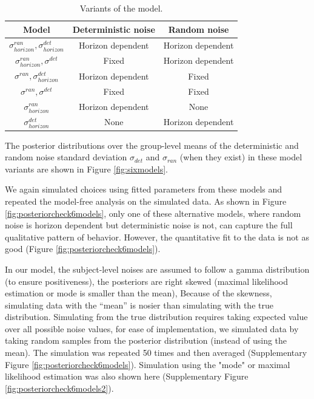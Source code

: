\documentclass[12pt]{article}
\begin{document}
	\begin{table}[h]
		\small
		\centering
		\begin{tabular}{|c|c|c|}
			\hline
			Model & Deterministic noise & Random noise \\
			\hline
			$\sigma^{ran}_{horizon},\sigma^{det}_{horizon}$  & Horizon dependent & Horizon dependent\\
			\hline
			$\sigma^{ran}_{horizon},\sigma^{det}_{}$ & Fixed & Horizon dependent\\
			\hline
			$\sigma^{ran}_{},\sigma^{det}_{horizon}$ & Horizon dependent & Fixed\\
			\hline
			$\sigma^{ran}_{},\sigma^{det}_{}$ & Fixed & Fixed\\
			\hline
			$\sigma^{ran}_{horizon}$ & Horizon dependent & None\\
			\hline
			$\sigma^{det}_{horizon}$ & None & Horizon dependent\\
			\hline
		\end{tabular}
		\caption{Variants of the model.}
		\label{tab:models}	
	\end{table}

	The posterior distributions over the group-level means of the deterministic and random noise standard deviation $\sigma_{det}$ and $\sigma_{ran}$ (when they exist) in these model variants are shown in Figure \ref{fig:sixmodels}. 
	
	We again simulated choices using fitted parameters from these models and repeated the model-free analysis on the simulated data. As shown in Figure \ref{fig:posteriorcheck6models}, only one of these alternative models, where random noise is horizon dependent but deterministic noise is not, can capture the full qualitative pattern of behavior. However, the quantitative fit to the data is not as good (Figure \ref{fig:posteriorcheck6models}).%
	
	In our model, the subject-level noises are assumed to follow a gamma distribution (to ensure positiveness), the posteriors are right skewed (maximal likelihood estimation or mode is smaller than the mean), Because of the skewness, simulating data with the “mean” is nosier than simulating with the true distribution. Simulating from the true distribution requires taking expected value over all possible noise values, for ease of implementation, we simulated data by taking random samples from the posterior distribution (instead of using the mean). The simulation was repeated 50 times and then averaged (Supplementary Figure \ref{fig:posteriorcheck6models}). Simulation using the "mode" or maximal likelihood estimation was also shown here (Supplementary Figure \ref{fig:posteriorcheck6models2}).
	
\end{document}

